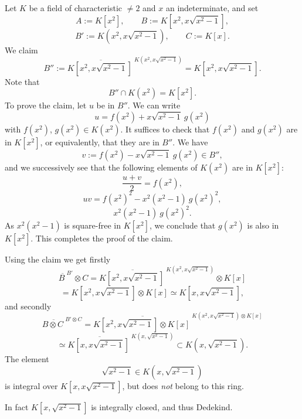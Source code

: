 \documentclass[parskip=half,fontsize=12pt]{scrartcl}%
\newcommand{\oo}{\operatorname}\newcommand{\ooo}{\operatorname*}
\begin{document}
Let $K$ be a field of characteristic $\ne2$ and $x$ an indeterminate, and set 
$$
A:=K[x^2],\qquad B:=K\left[x^2,x\sqrt{x^2-1}\right],
$$
$$
B':=K\left(x^2,x\sqrt{x^2-1}\right),\qquad C:=K[x].
$$ 
We claim 
$$
B'':=\overline{K\left[x^2,x\sqrt{x^2-1}\right]\ }^{K\left(x^2,x\sqrt{x^2-1}\right)}=K\left[x^2,x\sqrt{x^2-1}\right].
$$ 
Note that 
$$
B''\cap K(x^2)=K[x^2].
$$ 
To prove the claim, let $u$ be in $B''$. We can write 
$$
u=f(x^2)+x\sqrt{x^2-1}\ g(x^2)
$$ 
with $f(x^2)$, $g(x^2)\in K(x^2)$. It suffices to check that $f(x^2)$ and $g(x^2)$ are in $K[x^2]$, or equivalently, that they are in $B''$. We have 
$$
v:=f(x^2)-x\sqrt{x^2-1}\ g(x^2)\in B'',
$$ 
and we successively see that the following elements of $K(x^2)$ are in $K[x^2]$: 
$$
\frac{u+v}2=f(x^2),
$$ 
$$
uv=f(x^2)^2-x^2(x^2-1)\ g(x^2)^2,
$$ 
$$
x^2(x^2-1)\ g(x^2)^2.
$$ 
As $x^2(x^2-1)$ is square-free in $K[x^2]$, we conclude that $g(x^2)$ is also in $K[x^2]$. This completes the proof of the claim. 

Using the claim we get firstly
$$
\overline{B\ }^{B'}\otimes C=\overline{K\left[x^2,x\sqrt{x^2-1}\right]\ }^{K\left(x^2,x\sqrt{x^2-1}\right)}\otimes K[x]
$$
$$
=K\left[x^2,x\sqrt{x^2-1}\right]\otimes K[x]\simeq K\left[x,x\sqrt{x^2-1}\right],
$$ 
and secondly 
$$ 
\overline{B\otimes C\ }^{B'\otimes C}=\overline{K\left[x^2,x\sqrt{x^2-1}\right]\otimes K[x]\ }^{K\left(x^2,x\sqrt{x^2-1}\right)\otimes K[x]}
$$
$$
\simeq\overline{K\left[x,x\sqrt{x^2-1}\right]\ }^{K\left(x,\sqrt{x^2-1}\right)}\subset K\left(x,\sqrt{x^2-1}\right).
$$ 
The element 
$$
\sqrt{x^2-1}\in K\left(x,\sqrt{x^2-1}\right)
$$ 
is integral over $K\left[x,x\sqrt{x^2-1}\right]$, but does \emph{not} belong to this ring.

In fact $K\left[x,\sqrt{x^2-1}\right]$ is integrally closed, and thus Dedekind.

\begin{comment}
For any morphism of rings $g:A_1\to A_2$ write $\oo{IC}_{A_2}(A_1)$ for the integral closure of $A_1$ in $A_2$. Then we have, in the setting of Exercise 5.3, 
$$
\oo{IC}_{B'\otimes C}(B\otimes C)=(i\otimes1)(\oo{IC}_{B'}(B)\otimes C),
$$ 
where the tensor products are taken over $A$ and the morphism $i$ is the inclusion of $\oo{IC}_{B'}(B)$ into $B'$.

In particular, if $\phi:A\to B$ is a morphism of rings and $x$ an indeterminate, then we get 
$$
\oo{IC}_{B[x]}(A[x])=\oo{IC}_B(A)[x].
$$ 
Indeed we have $A[x]=A\otimes_{\mathbb Z}\mathbb Z[x]$, and similarly for $B$.
\end{comment}
\end{document}
